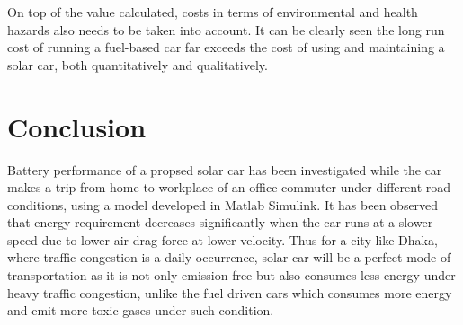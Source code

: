 \documentclass[journal]{IEEEtran/IEEEtran}
\begin{document}
	On top of the value calculated, costs in terms of environmental and health hazards also needs to be taken into account. It can be clearly seen the long run cost of running a fuel-based car far exceeds the cost of using and maintaining a solar car, both quantitatively and qualitatively.
	\section{Conclusion}
	Battery performance of a propsed solar car has been investigated while the car makes a trip from home to workplace of an office commuter under different road conditions, using a model developed in Matlab Simulink. It has been observed that energy requirement decreases significantly when the car runs at a slower speed due to lower air drag force at lower velocity. Thus for a city like Dhaka, where traffic congestion is a daily occurrence, solar car will be a perfect mode of transportation as it is not only emission free but also consumes less energy under heavy traffic congestion, unlike the fuel driven cars which consumes more energy and emit more toxic gases under such condition. 
	
	
	
	
\end{document}

